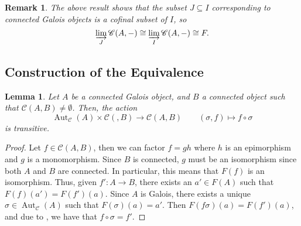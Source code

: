 \documentclass[10pt]{article}
\theoremstyle{thmstyle}
\newtheorem{lemma}[theorem]{Lemma}
\theoremstyle{defstyle}
\newtheorem{remark}[theorem]{Remark}
\newcommand{\Aut}{\operatorname{Aut}}
\newcommand{\scrC}{\mathscr{C}} %
\begin{document}
\begin{remark}
    The above result shows that the subset $J\subseteq I$ corresponding to connected Galois objects is a cofinal subset of $I$, so 
    \begin{equation*}
        \varinjlim_{J}\scrC(A, -)\cong\varinjlim_{I}\scrC(A, -)\cong F.
    \end{equation*}
\end{remark}

\subsection{Construction of the Equivalence}

\begin{lemma}
    Let $A$ be a connected Galois object, and $B$ a connected object such that $\scrC(A, B)\ne\emptyset$. Then, the action 
    \begin{equation*}
        \Aut_{\scrC}(A)\times\scrC(, B)\to\scrC(A, B)\qquad (\sigma, f)\mapsto f\circ\sigma
    \end{equation*}
    is transitive.
\end{lemma}
\begin{proof}
    Let $f\in\scrC(A, B)$, then we can factor $f = gh$ where $h$ is an epimorphism and $g$ is a monomorphism. Since $B$ is connected, $g$ must be an isomorphism since both $A$ and $B$ are connected. In particular, this means that $F(f)$ is an isomorphism. Thus, given $f': A\to B$, there exists an $a'\in F(A)$ such that $F(f)(a') = F(f')(a)$. Since $A$ is Galois, there exists a unique $\sigma\in\Aut_{\scrC}(A)$ such that $F(\sigma)(a) = a'$. Then $F(f\sigma)(a) = F(f')(a)$, and due to , we have that $f\circ\sigma = f'$.
\end{proof}
\end{document}
